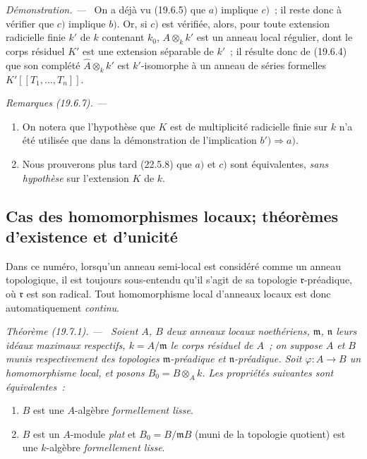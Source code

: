 \documentclass[10pt,oneside]{book}
\makeatletter
\newcommand{\setmanualcurrentlabel}[1]{\def\@currentlabel{#1}}
\newcommand{\oldpage}[2][]{%
  \setcounter{footnote}{0}%
  \marginpar{\scriptsize\textbf{#1}~|~#2}\ignorespaces}
\newenvironment{theorem}[1][]{%
  \setmanualcurrentlabel{#1}\par\medskip\noindent\itshape Théorème (#1). ---\ }{\par}
\newenvironment{remarks}[1][]{%
  \setmanualcurrentlabel{#1}\par\medskip\noindent\itshape Remarques (#1). ---\ }{\par}
\newenvironment{proof}{%
  \par\medskip\noindent\textit{Démonstration. ---\ }}{\par}
\makeatother
\begin{document}
\begin{proof}
On a déjà vu (19.6.5) que $a)$ implique $c)$~; il reste donc à vérifier que
$c)$ implique $b)$. Or, si $c)$ est vérifiée, alors, pour toute extension
radicielle finie $k'$ de $k$ contenant $k_0$, $A\otimes_k k'$ est un anneau
local régulier, dont le corps résiduel $K'$ est une extension séparable de
$k'$~; il résulte donc de (19.6.4) que son complété
$\widehat A\otimes_k k'$ est $k'$-isomorphe à un anneau de séries formelles
$K'[[T_1,\ldots,T_n]]$.
\end{proof}

\begin{remarks}[19.6.7]
\label{0.19.6.7-fr}
\begin{enumerate}
  \item[\rm(i)] On notera que l'hypothèse que $K$ est de multiplicité
  radicielle finie sur $k$ n'a été utilisée que dans la démonstration de
  l'implication $b')\Rightarrow a)$.
  \item[\rm(ii)] Nous prouverons plus tard (22.5.8) que $a)$ et $c)$ sont
  équivalentes, \emph{sans hypothèse} sur l'extension $K$ de $k$.
\end{enumerate}
\end{remarks}

\subsection{Cas des homomorphismes locaux; théorèmes d'existence et
d'unicité}
\label{subsection:0.19.7-fr}

Dans ce numéro, lorsqu'un anneau semi-local est considéré comme un anneau
topologique, il est toujours sous-entendu qu'il s'agit de sa topologie
$\mathfrak r$-préadique, où $\mathfrak r$ est son radical. Tout homomorphisme
local d'anneaux locaux est donc automatiquement \emph{continu}.

\begin{theorem}[19.7.1]
\label{0.19.7.1-fr}
Soient $A$, $B$ deux anneaux locaux noethériens, $\mathfrak m$, $\mathfrak n$
leurs idéaux maximaux respectifs, $k=A/\mathfrak m$ le corps résiduel de $A$~;
on suppose $A$ et $B$ munis respectivement des topologies
$\mathfrak m$-préadique et $\mathfrak n$-préadique. Soit
$\varphi:A\to B$ un homomorphisme local, et posons $B_0=B\otimes_A k$.
Les propriétés suivantes sont équivalentes~:
\begin{enumerate}
  \item[a)] $B$ est une $A$-algèbre \emph{formellement lisse}.

\oldpage[0\textsubscript{IV-1}]{105}

  \item[b)] $B$ est un $A$-module \emph{plat} et
  $B_0=B/\mathfrak mB$ (muni de la topologie quotient) est une $k$-algèbre
  \emph{formellement lisse}.
\end{enumerate}
\end{theorem}
\end{document}

